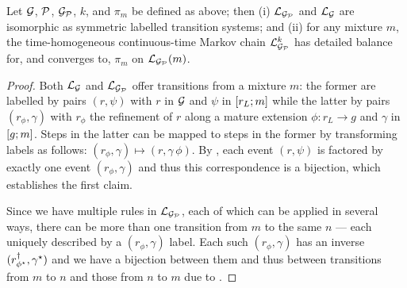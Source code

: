 \begin{theorem}
  \label{thm:detailed-balance}
  Let $\mathcal{G}$, $\mathcal{P}$, $\mathcal{G}_{\mathcal{P}}$,
  $k$, and $\pi_m$ be defined as above;
  then (i) $\mathcal{L}_{\mathcal{G}_{\mathcal{P}}}$ and $\mathcal{L}_{\mathcal{G}}$ are isomorphic
  as symmetric labelled transition systems;
  and (ii) for any mixture $m$,
  the time-homogeneous continuous-time Markov chain
  $\mathcal{L}^k_{\mathcal{G}_{\mathcal{P}}}$ has detailed balance for, and converges to,
  $\pi_m$ on $\mathcal{L}_{\mathcal{G}_{\mathcal{P}}}(m)$.
\end{theorem}
\begin{proof}
  Both $\mathcal{L}_{\mathcal{G}}$ and $\mathcal{L}_{\mathcal{G}_{\mathcal{P}}}$
  offer transitions from a mixture $m$:
  the former are labelled by pairs $(r,\psi)$
  with $r$ in $\mathcal{G}$
  and $\psi$ in $\left[r_L;m\right]$
  while the latter by pairs $(r_\phi,\gamma)$
  with $r_\phi$ the refinement of $r$
  along a mature extension $\phi: r_L \to g$
  and $\gamma$ in $\left[g;m\right]$.
  Steps in the latter can be mapped to steps in the former
  by transforming labels as follows:
  $(r_\phi, \gamma) \mapsto (r, \gamma \, \phi)$.
  By , each event $(r,\psi)$ is factored by
  exactly one event $(r_\phi,\gamma)$ and thus
  this correspondence is a bijection,
  which establishes the first claim.


  Since we have multiple rules in $\mathcal{L}_{\mathcal{G}_{\mathcal{P}}}$,
  each of which can be applied in several ways,
  there can be more than one transition from $m$ to the same $n$ ---
  each uniquely described by a $(r_\phi,\gamma)$ label.
  Each such $(r_\phi,\gamma)$ has an inverse
  $(r^\dagger_{\phi^\star},\gamma^\star)$
  and we have a bijection between them and thus between
  transitions from $m$ to $n$ and those from $n$ to $m$
  due to .


\end{proof}
